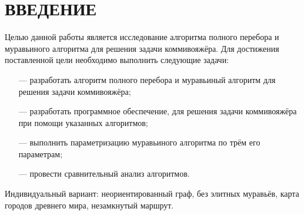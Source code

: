 \chapter*{\hfill{\centering \MakeUppercase{Введение}}\hfill} %

Целью данной работы является исследование алгоритма полного перебора и муравьиного алгоритма для решения задачи коммивояжёра.
Для достижения поставленной цели необходимо выполнить следующие задачи:
\begin{itemize}
    \item[---] разработать алгоритм полного перебора и муравьиный алгоритм для решения задачи коммивояжёра;
    \item[---] разработать программное обеспечение, для решения задачи коммивояжёра при помощи указанных алгоритмов;
    \item[---] выполнить параметризацию муравьиного алгоритма по трём его параметрам;
    \item[---] провести сравнительный анализ алгоритмов.
\end{itemize}

Индивидуальный вариант: неориентированный граф, без элитных муравьёв, карта городов древнего мира, незамкнутый маршрут.